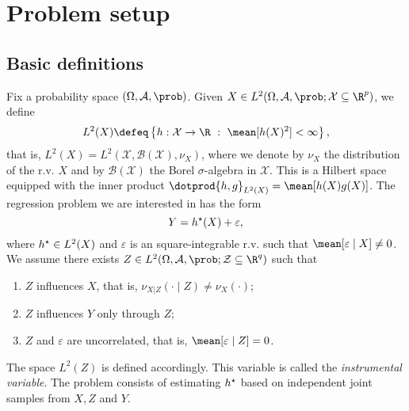 \section{Problem setup}

\subsection{Basic definitions}

Fix a probability space $ ( \Omega, \mathcal{A}, \prob ) $.
Given $ X \in L^{ 2 } ( \Omega, \mathcal{A}, \prob ; \mathcal{X} \subseteq \R^{ p } ) $, we define
\begin{equation*}
    L^{ 2 } ( X ) \defeq \left\{ h : \mathcal{X} \to \R \ : \ \mean [ h ( X )^2 ] < \infty \right\}
,\end{equation*}
that is, $ L^{ 2 } ( X ) = L^{ 2 } ( \mathcal{X}, \mathcal{B} ( \mathcal{X} ), \nu_{ X } ) $, where we denote by $ \nu_{ X } $ the distribution of the r.v. $ X $ and by $ \mathcal{B} ( \mathcal{X} ) $ the Borel $ \sigma $-algebra in $ \mathcal{X} $.
This is a Hilbert space equipped with the inner product $ \dotprod{ h, g }_{ L^{ 2 } ( X ) } = \mean [ h ( X ) g ( X ) ] $.
The regression problem we are interested in has the form
\begin{equation}
    \label{eq: main problem}
    Y = h^{ \star } (X) + \varepsilon
,\end{equation}
where $ h^{ \star } \in L^{ 2 } ( X ) $ and $ \varepsilon $ is an square-integrable r.v. such that $ \mean [ \varepsilon \mid X ] \neq 0 $.
We assume there exists $ Z \in L^{ 2 } ( \Omega, \mathcal{A}, \prob ; \mathcal{Z} \subseteq \R^{ q } ) $ such that
\begin{enumerate}[label=\roman*)]
    \item $ Z $ influences $ X $, that is, $ \nu_{ X|Z } ( \cdot \mid Z ) \neq \nu_{ X } ( \cdot ) $;
    \item $ Z $ influences $ Y $ only through $ Z $;
    \item $ Z $ and $ \varepsilon $ are uncorrelated, that is, $ \mean [ \varepsilon \mid Z ] = 0 $.
\end{enumerate}
The space $ L^{ 2 } ( Z ) $ is defined accordingly.
This variable is called the \emph{instrumental variable}.
The problem consists of estimating $ h^{ \star } $ based on independent joint samples from $ X, Z $ and $ Y $.

